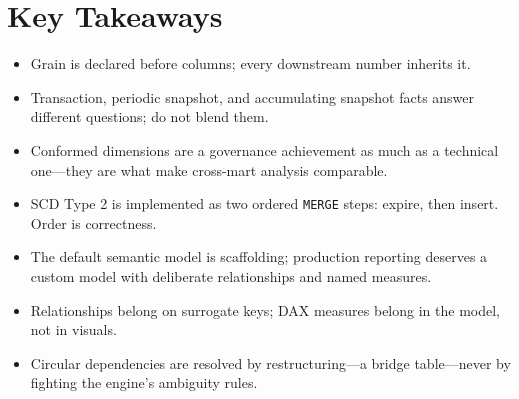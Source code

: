 \section*{Key Takeaways}
\begin{itemize}
    \item Grain is declared before columns; every downstream number inherits it.
    \item Transaction, periodic snapshot, and accumulating snapshot facts answer different questions; do not blend them.
    \item Conformed dimensions are a governance achievement as much as a technical one---they are what make cross-mart analysis comparable.
    \item SCD Type 2 is implemented as two ordered \texttt{MERGE} steps: expire, then insert. Order is correctness.
    \item The default semantic model is scaffolding; production reporting deserves a custom model with deliberate relationships and named measures.
    \item Relationships belong on surrogate keys; DAX measures belong in the model, not in visuals.
    \item Circular dependencies are resolved by restructuring---a bridge table---never by fighting the engine's ambiguity rules.
\end{itemize}

